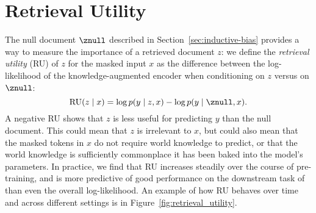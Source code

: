 \section{Retrieval Utility}
The null document $\znull$ described in Section~\ref{sec:inductive-bias}
provides a way to measure the importance of a retrieved document $z$: we define the \emph{retrieval utility} (RU) of $z$ for the masked input $x$ as
the difference between the log-likelihood of the knowledge-augmented encoder when conditioning on $z$ versus on $\znull$:
\begin{equation}
\text{RU}(z \mid x) = \log p(y \mid z, x) - \log p(y \mid \znull, x). 
\label{eq:retrieval_utility}
\end{equation}
A negative RU shows that $z$ is less useful for predicting $y$ than the null document. This could mean that $z$ is irrelevant to $x$, but could also mean that the masked tokens in $x$ do not require world knowledge to predict, or that the world knowledge is sufficiently commonplace it has been baked into the model's parameters. In practice, we find that RU increases steadily over the course of pre-training, and is more predictive of good performance on the downstream task of \openqa than even the overall log-likelihood. An example of how RU behaves over time and across different settings is in Figure~\ref{fig:retrieval_utility}.
